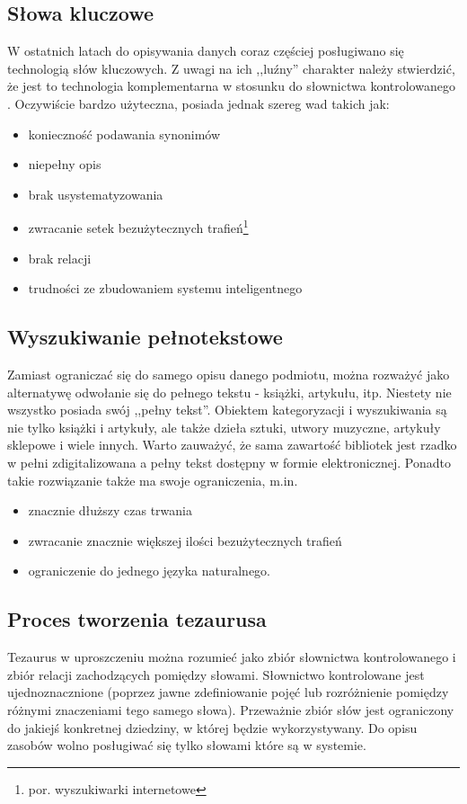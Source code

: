 \subsection{Słowa kluczowe}
W ostatnich latach do opisywania danych coraz częściej posługiwano się technologią słów kluczowych. Z uwagi na ich ,,luźny'' charakter należy stwierdzić, że jest to technologia komplementarna w stosunku do słownictwa kontrolowanego \cite{KasperekKonf}. Oczywiście bardzo użyteczna, posiada jednak szereg wad takich jak:
\begin{itemize}
   \item konieczność podawania synonimów
	\item niepełny opis
	\item brak usystematyzowania
	\item zwracanie setek bezużytecznych trafień\footnote{por. wyszukiwarki internetowe}
	\item brak relacji
	\item trudności ze zbudowaniem systemu inteligentnego
\end{itemize}    

\subsection{Wyszukiwanie pełnotekstowe}
Zamiast ograniczać się do samego opisu danego podmiotu, można rozważyć jako alternatywę odwołanie się do pełnego tekstu - książki, artykułu, itp. Niestety nie wszystko posiada swój ,,pełny tekst''. Obiektem kategoryzacji i wyszukiwania są nie tylko książki i artykuły, ale także dzieła sztuki, utwory muzyczne, artykuły sklepowe i wiele innych. Warto zauważyć, że sama zawartość bibliotek jest rzadko w pełni zdigitalizowana a pełny tekst dostępny w formie elektronicznej. Ponadto takie rozwiązanie także ma swoje ograniczenia, m.in.
 \begin{itemize}
   \item znacznie dłuższy czas trwania
	\item zwracanie znacznie większej ilości bezużytecznych trafień
	\item ograniczenie do jednego języka naturalnego.
\end{itemize}

\subsection{Proces tworzenia tezaurusa}
Tezaurus w uproszczeniu można rozumieć jako zbiór słownictwa kontrolowanego i zbiór relacji zachodzących pomiędzy słowami.
Słownictwo kontrolowane jest ujednoznacznione (poprzez jawne zdefiniowanie pojęć lub rozróżnienie pomiędzy różnymi znaczeniami tego samego słowa). Przeważnie zbiór słów jest ograniczony do jakiejś konkretnej dziedziny, w której będzie wykorzystywany. Do opisu zasobów wolno posługiwać się tylko słowami które są w systemie. 

